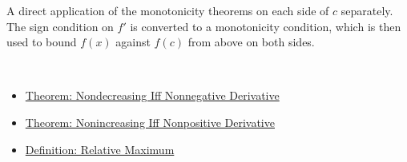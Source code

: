 \begin{remark*}
A direct application of the monotonicity theorems on each side of $c$ separately. The sign condition on $f'$ is converted to a monotonicity condition, which is then used to bound $f(x)$ against $f(c)$ from above on both sides.
\end{remark*}

\begin{remark*}[Dependencies]~\\
\begin{itemize}
  \item \hyperref[thm:nondecreasing-iff-nonneg-derivative]{Theorem: Nondecreasing Iff Nonneg\-ative Derivative}
  \item \hyperref[thm:nonincreasing-iff-nonpos-derivative]{Theorem: Nonincreasing Iff Nonpos\-itive Derivative}
  \item \hyperref[def:relative-maximum]{Definition: Relative Maximum}
\end{itemize}
\end{remark*}
